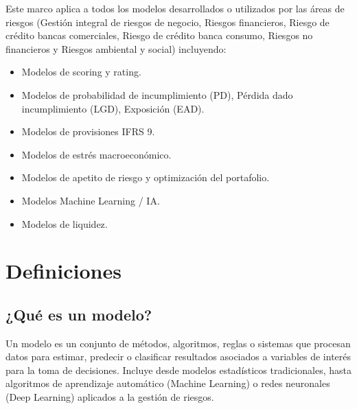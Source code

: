 \documentclass[11pt,oneside]{article}%
\begin{document}
Este marco aplica a todos los modelos desarrollados o utilizados por las áreas de riesgos (Gestión integral de riesgos de negocio, Riesgos financieros, Riesgo de crédito bancas comerciales, Riesgo de crédito banca consumo, Riesgos no financieros y Riesgos ambiental y social) incluyendo: 
\begin{itemize}
\item Modelos de scoring y rating. 
\item Modelos de probabilidad de incumplimiento  (PD), Pérdida dado incumplimiento (LGD), Exposición (EAD). 
\item Modelos de provisiones IFRS 9.
\item Modelos de estrés macroeconómico.
\item Modelos de apetito de riesgo y optimización del portafolio. 
\item Modelos Machine Learning / IA. 
\item Modelos de liquidez.
\end{itemize} 

\section{Definiciones}
\subsection{¿Qué es un modelo?}
Un modelo es un conjunto de métodos, algoritmos, reglas o sistemas que procesan datos para estimar, predecir o clasificar resultados asociados a variables de interés para la toma de decisiones. Incluye desde modelos estadísticos tradicionales, hasta algoritmos de aprendizaje automático (Machine Learning) o redes neuronales (Deep Learning) aplicados a la gestión de riesgos.  
\end{document}
